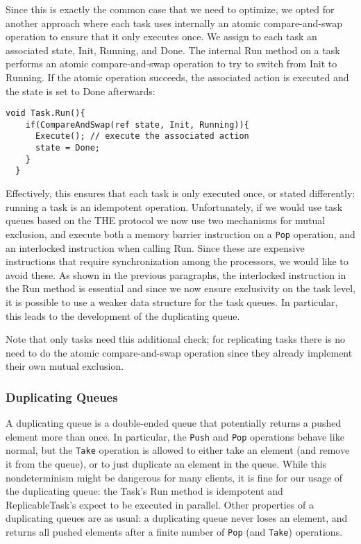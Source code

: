 Since this is exactly the common case that we need to optimize, we
opted for another approach where each task uses internally an atomic
compare-and-swap operation to ensure that it only executes once. We
assign to each task an associated state, Init, Running, and Done. The
internal Run method on a task performs an atomic compare-and-swap
operation to try to switch from Init to Running. If the atomic
operation succeeds, the associated action is executed and the state is
set to Done afterwards:

\begin{lstlisting}[style=Listing]
  void Task.Run(){
    if(CompareAndSwap(ref state, Init, Running)){
      Execute(); // execute the associated action
      state = Done;
    }
  }
\end{lstlisting}

Effectively, this ensures that each task is only executed once, or
stated differently: running a task is an idempotent
operation. Unfortunately, if we would use task queues based on the THE
protocol we now use two mechanisms for mutual exclusion, and execute
both a memory barrier instruction on a \lstinline!Pop! operation, and
an interlocked instruction when calling Run. Since these are expensive
instructions that require synchronization among the processors, we
would like to avoid these. As shown in the previous paragraphs, the
interlocked instruction in the Run method is essential and since we
now ensure exclusivity on the task level, it is possible to use a
weaker data structure for the task queues. In particular, this leads
to the development of the duplicating queue.

Note that only tasks need this additional check; for replicating tasks
there is no need to do the atomic compare-and-swap operation since
they already implement their own mutual exclusion.

\subsubsection{Duplicating Queues}

A duplicating queue is a double-ended queue that potentially returns a
pushed element more than once. In particular, the \lstinline!Push! and
\lstinline!Pop! operations behave like normal, but the
\lstinline!Take! operation is allowed to either take an element (and
remove it from the queue), or to just duplicate an element in the
queue. While this nondeterminism might be dangerous for many clients,
it is fine for our usage of the duplicating queue: the Task's Run
method is idempotent and ReplicableTask's expect to be executed in
parallel. Other properties of a duplicating queues are as usual: a
duplicating queue never loses an element, and returns all pushed
elements after a finite number of \lstinline!Pop! (and
\lstinline!Take!) operations.

